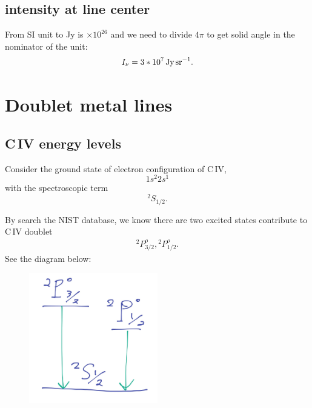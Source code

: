 \documentclass[12pt,letterpaper]{article}
\newcommand{\civ}{\textrm{C\,IV}}
\begin{document}
\subsection{intensity at line center}
From SI unit to Jy is $\times 10^{26}$ and we need to divide $4\pi$ to get solid angle in the nominator of the unit:
\begin{equation*}
    I_\nu = 3 * 10^{7} \textrm{\,Jy\,sr}^{-1}.
\end{equation*}

\section{Doublet metal lines}

\subsection{{\civ} energy levels}
Consider the ground state of electron configuration of {\civ},
\begin{equation*}
    1s^2 2s^1
\end{equation*}
with the spectroscopic term 
\begin{equation*}
    {^2}S_{1/2}.
\end{equation*}

By search the NIST database, we know there are two excited states contribute to {\civ} doublet
\begin{equation*}
    \begin{split}
        {^2P^o_{3/2}}, {{^2}P^o_{1/2}}.
    \end{split}
\end{equation*}
See the diagram below:
\begin{figure}[H]
    \centering
    \includegraphics[width=0.5\textwidth]{images/levels.jpg}
\end{figure}
\end{document}
